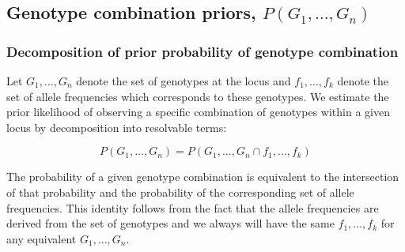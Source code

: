 \documentclass{article}
\begin{document}

\subsection{Genotype combination priors, $P(G_1,\ldots,G_n)$}

\subsubsection{Decomposition of prior probability of genotype combination}

Let $G_1,\ldots,G_n$ denote the set of genotypes at the locus and $f_1,\ldots,f_k$ denote the set of allele frequencies which corresponds to these genotypes.  We estimate the prior likelihood of observing a specific combination of genotypes within a given locus by decomposition into resolvable terms:

\begin{equation}
P(G_1,\ldots,G_n) = P(G_1,\ldots,G_n \cap f_1,\ldots,f_k)
\end{equation}

The probability of a given genotype combination is equivalent to the intersection of that probability and the probability of the corresponding set of allele frequencies.  This identity follows from the fact that the allele frequencies are derived from the set of genotypes and we always will have the same $f_1,\ldots,f_k$ for any equivalent $G_1,\ldots,G_n$.
\end{document}

